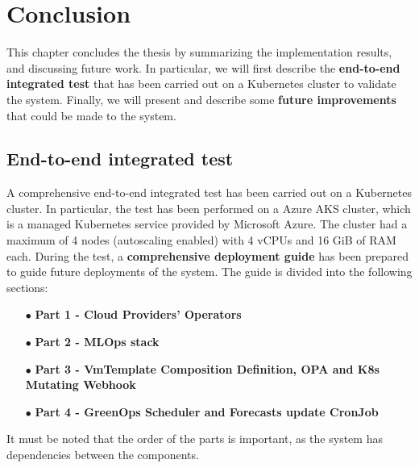 \chapter{Conclusion}
\label{cha:conclusion}

This chapter concludes the thesis by summarizing the implementation results, and discussing future work.
In particular, we will first describe the \textbf{end-to-end integrated test} that has been carried out on a Kubernetes cluster to validate the system.
Finally, we will present and describe some \textbf{future improvements} that could be made to the system.

\section{End-to-end integrated test}

A comprehensive end-to-end integrated test has been carried out on a Kubernetes cluster. 
In particular, the test has been performed on a Azure AKS cluster, which is a managed Kubernetes service provided by Microsoft Azure.
The cluster had a maximum of 4 nodes (autoscaling enabled) with 4 vCPUs and 16 GiB of RAM each.
During the test, a \textbf{comprehensive deployment guide} has been prepared to guide future deployments of the system.
The guide is divided into the following sections:
\begin{itemize}[itemsep=0.2pt, topsep=1pt]
    \item[$\bullet$] \textbf{Part 1 - Cloud Providers' Operators}
    \item[$\bullet$] \textbf{Part 2 - MLOps stack}
    \item[$\bullet$] \textbf{Part 3 - VmTemplate Composition Definition, OPA and K8s Mutating Webhook}
    \item[$\bullet$] \textbf{Part 4 - GreenOps Scheduler and Forecasts update CronJob}
\end{itemize}

It must be noted that the order of the parts is important, as the system has dependencies between the components.





